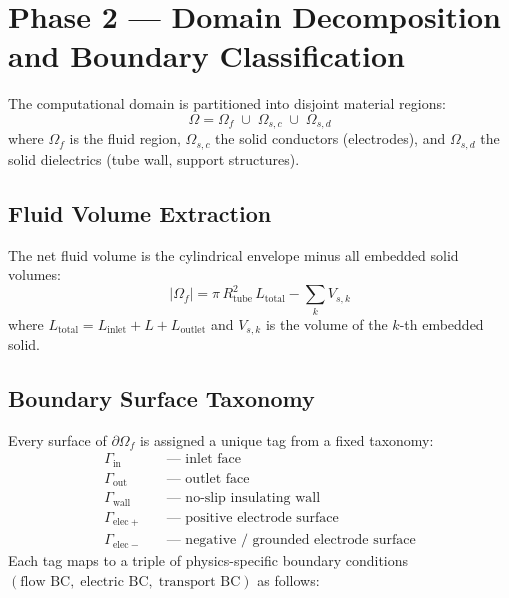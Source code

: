 \documentclass[11pt,a4paper]{article}
\begin{document}
\section{Phase 2 — Domain Decomposition and Boundary Classification}
\label{sec:phase2}

The computational domain is partitioned into disjoint material regions:
\begin{equation}\label{eq:domain_decomp}
  \Omega = \Omega_f \;\cup\; \Omega_{s,c} \;\cup\; \Omega_{s,d}
\end{equation}
where $\Omega_f$ is the fluid region, $\Omega_{s,c}$ the solid conductors
(electrodes), and $\Omega_{s,d}$ the solid dielectrics (tube wall, support
structures).

\subsection{Fluid Volume Extraction}

The net fluid volume is the cylindrical envelope minus all embedded solid
volumes:
\begin{equation}\label{eq:fluid_volume}
  |\Omega_f| = \pi\,R_{\mathrm{tube}}^2\,L_{\mathrm{total}}
             - \sum_k V_{s,k}
\end{equation}
where $L_{\mathrm{total}} = L_{\mathrm{inlet}} + L + L_{\mathrm{outlet}}$ and
$V_{s,k}$ is the volume of the $k$-th embedded solid.

\subsection{Boundary Surface Taxonomy}

Every surface of $\partial\Omega_f$ is assigned a unique tag from a fixed
taxonomy:
\begin{align}
  \Gamma_{\mathrm{in}}     &\quad\text{— inlet face}  \\
  \Gamma_{\mathrm{out}}    &\quad\text{— outlet face}  \\
  \Gamma_{\mathrm{wall}}   &\quad\text{— no-slip insulating wall}  \\
  \Gamma_{\mathrm{elec}+}  &\quad\text{— positive electrode surface}  \\
  \Gamma_{\mathrm{elec}-}  &\quad\text{— negative / grounded electrode surface}
\end{align}
Each tag maps to a triple of physics-specific boundary conditions
$(\text{flow BC},\;\text{electric BC},\;\text{transport BC})$ as follows:
\end{document}
